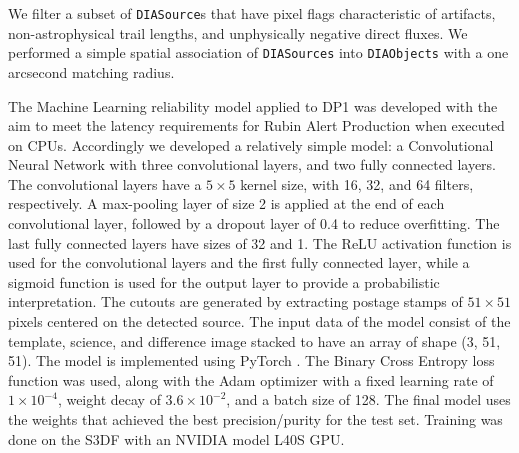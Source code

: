 We filter a subset of \texttt{DIASource}s that have pixel flags characteristic of artifacts, non-astrophysical trail lengths, and unphysically negative direct fluxes.
We performed a simple spatial association of \texttt{DIASources} into \texttt{DIAObjects} with a one arcsecond matching radius.

The Machine Learning reliability model applied to DP1 was developed with the aim to meet the latency requirements for Rubin \gls{Alert Production} when executed on CPUs. Accordingly we developed a relatively simple model: a Convolutional Neural Network with three convolutional layers, and two fully connected layers.
The convolutional layers have a $5\times5$ kernel size, with 16, 32, and 64 filters, respectively.
A max-pooling layer of size 2 is applied at the end of each convolutional layer, followed by a dropout layer of 0.4 to reduce overfitting.
The last fully connected layers have sizes of 32 and 1.
The ReLU activation function is used for the convolutional layers and the first fully connected layer, while a sigmoid function is used for the output layer to provide a probabilistic interpretation.
The cutouts are generated by extracting postage stamps of $51\times51$ pixels centered on the detected source.
The input data of the model consist of the template, science, and difference image stacked to have an array of \gls{shape} (3, 51, 51).
The model is implemented using PyTorch \citep{10.1145/3620665.3640366}.
The Binary Cross Entropy loss function was used, along with the \gls{Adam} optimizer with a fixed learning rate of $1\times10^{-4}$, weight decay of $3.6\times10^{-2}$, and a batch size of 128.
The final model uses the weights that achieved the best precision/purity for the test set.
Training was done on the \gls{S3DF} with an NVIDIA model L40S GPU.

